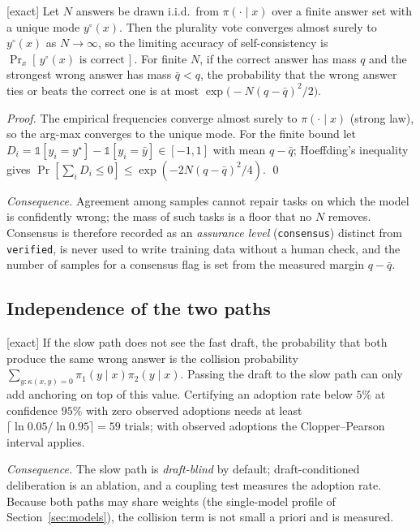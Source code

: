 \begin{theorem}
\textnormal{[exact]}
\label{thm:plurality}
Let $N$ answers be drawn i.i.d.\ from $\pi(\cdot\mid x)$ over a finite answer
set with a unique mode $y^\circ(x)$. Then the plurality vote converges almost
surely to $y^\circ(x)$ as $N\to\infty$, so the limiting accuracy of
self-consistency is $\Pr_x[\,y^\circ(x)\text{ is correct}\,]$. For finite $N$,
if the correct answer has mass $q$ and the strongest wrong answer has mass
$\bar q<q$, the probability that the wrong answer ties or beats the correct one
is at most $\exp\!\big(-N(q-\bar q)^2/2\big)$.
\end{theorem}
\begin{proof}
The empirical frequencies converge almost surely to $\pi(\cdot\mid x)$
(strong law), so the arg-max converges to the unique mode. For the finite
bound let $D_i=\mathbb 1[y_i=y^\star]-\mathbb 1[y_i=\bar y]\in[-1,1]$ with mean
$q-\bar q$; Hoeffding's inequality \cite{hoeffding1963} gives
$\Pr[\sum_iD_i\le0]\le\exp(-2N(q-\bar q)^2/4)$. \qed
\end{proof}
\emph{Consequence.} Agreement among samples cannot repair tasks on which the
model is confidently wrong; the mass of such tasks is a floor that no $N$
removes. Consensus is therefore recorded as an \emph{assurance level}
(\texttt{consensus}) distinct from \texttt{verified}, is never used
to write training data without a human check, and the number of samples for a
consensus flag is set from the measured margin $q-\bar q$.

\subsection{Independence of the two paths}

\begin{proposition} \textnormal{[exact]}
\label{prop:collision}
If the slow path does not see the fast draft, the probability that both
produce the same wrong answer is the collision probability
$\sum_{y:\kappa(x,y)=0}\pi_1(y\mid x)\pi_2(y\mid x)$. Passing the draft to the
slow path can only add anchoring on top of this value. Certifying an adoption
rate below $5\%$ at confidence $95\%$ with zero observed adoptions needs at
least $\lceil\ln0.05/\ln0.95\rceil=59$ trials; with observed adoptions the
Clopper--Pearson interval \cite{clopper1934} applies.
\end{proposition}
\emph{Consequence.} The slow path is \emph{draft-blind} by default;
draft-conditioned deliberation is an ablation, and a coupling test measures
the adoption rate. Because both paths may share weights (the
single-model profile of Section~\ref{sec:models}), the collision term is not
small a priori and is measured.

